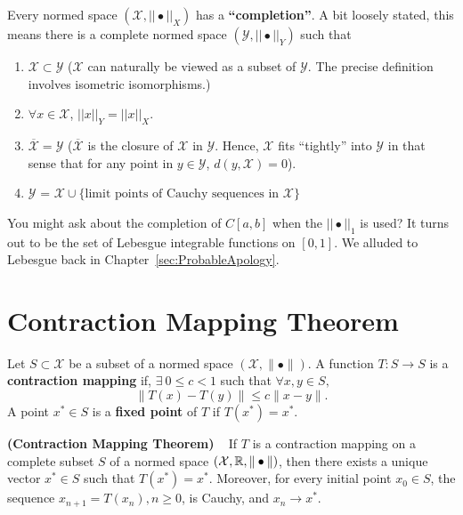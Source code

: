 \begin{fact} Every normed space $(\mathcal{X}, || \bullet ||_X)$ has a \textbf{``completion''}. A bit loosely stated, this means there is a complete normed space $(\mathcal{Y}, || \bullet ||_Y)$ such that
\begin{enumerate}
       \renewcommand{\labelenumi}{(\alph{enumi})}
        \setlength{\itemsep}{.1cm}
    \item $\mathcal{X} \subset \mathcal{Y}$ ($\mathcal{X}$ can naturally be viewed as a subset of $\mathcal{Y}$. The precise definition involves isometric isomorphisms.)
    \item $\forall x\in \mathcal{X}$, $||x||_Y = ||x||_X.$ 
    \item $\overline{\mathcal{X}} = \mathcal{Y}$ ($\overline{\mathcal{X}}$ is the closure of $\mathcal{X}$ in $\mathcal{Y}$. Hence, $\mathcal{X}$ fits ``tightly'' into $\mathcal{Y}$ in that sense that for any point in $y \in \mathcal{Y}$, $d(y, \mathcal{X})=0$).
    \item $\mathcal{Y}$ = $\mathcal{X} \cup\{ \text{limit points of Cauchy sequences in } \mathcal{X}\}$
\end{enumerate}

\end{fact}

You might ask about the completion of $C[a,b]$ when the $||\bullet||_1$ is used? It turns out to be the set of Lebesgue integrable functions on $[0,1]$. We alluded to Lebesgue back in Chapter~\ref{sec:ProbableApology}.
    

\section{Contraction Mapping Theorem}
\label{sec:Contraction}

\begin{definition}
 Let $S \subset \mathcal{X}$ be a subset of a normed space $(\mathcal{X}, \| \bullet \|)$. A function $T : S \to S$ is a \textbf{ contraction mapping} if,
$ \exists ~0 \leq c < 1$ such that $\forall x,y \in S,$ 
$$ \|T\left(x\right)-T\left(y\right)  \| \leq c \|x-y\|.$$ 
A point $x^\ast \in S$ is a \textbf{fixed point} of $T$ if $T(x^\ast) = x^\ast$.
\end{definition}


\begin{thm}\textbf{(Contraction Mapping Theorem)} ~ If $T$ is a contraction mapping on a complete subset $S$ of a normed space $\left(\mathcal{X},\mathbb R,\| \bullet \|\right)$, then there exists a unique vector $x^\ast \in S$ such that $T\left(x^\ast\right) = x^\ast$. Moreover, for every initial point $x_0 \in S$, the sequence $x_{n+1} = T\left(x_n\right), n \geq 0$, is Cauchy, and $x_n \to x^\ast$.
\end{thm}


